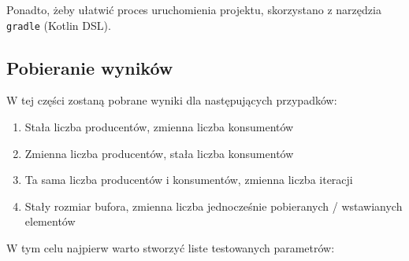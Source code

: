 \documentclass[11pt]{article}
\providecommand{\tightlist}{%
      \setlength{\itemsep}{0pt}\setlength{\parskip}{0pt}}
\begin{document}
Ponadto, żeby ułatwić proces uruchomienia projektu, skorzystano z
narzędzia \texttt{gradle} (Kotlin DSL).

    \hypertarget{pobieranie-wynikuxf3w}{%
\subsection{Pobieranie wyników}\label{pobieranie-wynikuxf3w}}

W tej części zostaną pobrane wyniki dla następujących przypadków:

\begin{enumerate}
\def\labelenumi{\arabic{enumi}.}
\tightlist
\item
  Stała liczba producentów, zmienna liczba konsumentów
\item
  Zmienna liczba producentów, stała liczba konsumentów
\item
  Ta sama liczba producentów i konsumentów, zmienna liczba iteracji
\item
  Stały rozmiar bufora, zmienna liczba jednocześnie pobieranych /
  wstawianych elementów
\end{enumerate}

W tym celu najpierw warto stworzyć liste testowanych parametrów:
\end{document}
